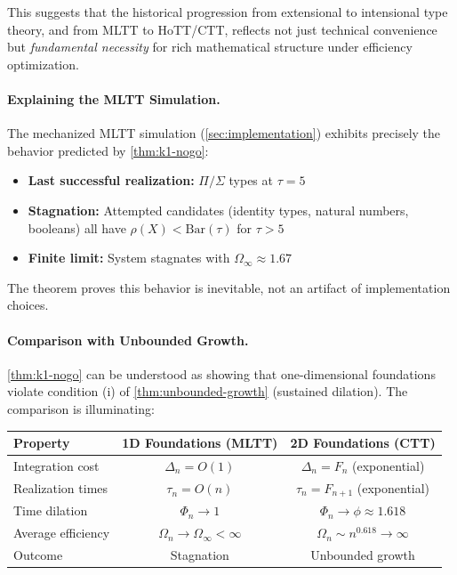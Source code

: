 \documentclass[11pt]{article}
\theoremstyle{definition}
\theoremstyle{remark}
\begin{document}
This suggests that the historical progression from extensional to intensional type theory, and from MLTT to HoTT/CTT, reflects not just technical convenience but \emph{fundamental necessity} for rich mathematical structure under efficiency optimization.

\paragraph{Explaining the MLTT Simulation.}

The mechanized MLTT simulation (\cref{sec:implementation}) exhibits precisely the behavior predicted by \cref{thm:k1-nogo}:
\begin{itemize}
\item \textbf{Last successful realization:} $\Pi/\Sigma$ types at $\tau = 5$
\item \textbf{Stagnation:} Attempted candidates (identity types, natural numbers, booleans) all have $\rho(X) < \mathrm{Bar}(\tau)$ for $\tau > 5$
\item \textbf{Finite limit:} System stagnates with $\Omega_{\infty} \approx 1.67$
\end{itemize}

The theorem proves this behavior is inevitable, not an artifact of implementation choices.

\paragraph{Comparison with Unbounded Growth.}

\cref{thm:k1-nogo} can be understood as showing that one-dimensional foundations violate condition (i) of \cref{thm:unbounded-growth} (sustained dilation). The comparison is illuminating:

\begin{center}
\begin{tabular}{l|c|c}
\textbf{Property} & \textbf{1D Foundations (MLTT)} & \textbf{2D Foundations (CTT)} \\
\hline
Integration cost & $\Delta_n = O(1)$ & $\Delta_n = F_n$ (exponential) \\
Realization times & $\tau_n = O(n)$ & $\tau_n = F_{n+1}$ (exponential) \\
Time dilation & $\Phi_n \to 1$ & $\Phi_n \to \phi \approx 1.618$ \\
Average efficiency & $\Omega_n \to \Omega_{\infty} < \infty$ & $\Omega_n \sim n^{0.618} \to \infty$ \\
Outcome & Stagnation & Unbounded growth \\
\end{tabular}
\end{center}
\end{document}
